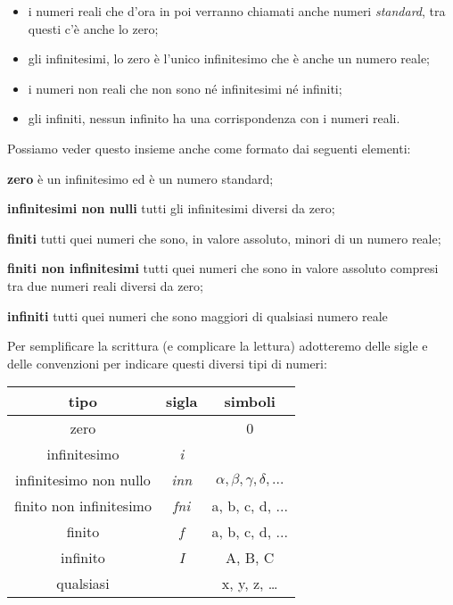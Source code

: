 \begin{itemize} [noitemsep]
 \item i numeri reali che d'ora in poi verranno chiamati anche numeri 
\emph{standard}, tra questi c'è anche lo zero;
 \item gli infinitesimi, lo zero è l'unico infinitesimo che è anche un numero 
reale;
 \item i numeri non reali che non sono né infinitesimi né infiniti;
 \item gli infiniti, nessun infinito ha una corrispondenza con i numeri reali.
\end{itemize}

Possiamo veder questo insieme anche come formato dai seguenti elementi:

\begin{description} [noitemsep]
 \item \textbf{zero}
 è un infinitesimo ed è un numero standard;
 \item \textbf{infinitesimi non nulli}
 tutti gli infinitesimi diversi da zero;
 \item \textbf{finiti}
 tutti quei numeri che sono, in valore assoluto, minori di un numero reale;
 \item \textbf{finiti non infinitesimi}
 tutti quei numeri che sono in valore assoluto compresi tra due numeri reali 
 diversi da zero;
 \item \textbf{infiniti}
 tutti quei numeri che sono maggiori di qualsiasi numero reale

\end{description}
 
Per semplificare la scrittura (e complicare la lettura) adotteremo delle sigle 
e delle convenzioni per indicare questi diversi tipi di numeri:

\begin{center}
\begin{tabular}{ccc}\toprule
tipo & sigla & simboli\\\midrule
zero &  & 0\\
infinitesimo & \emph{i} & \\
infinitesimo non nullo & \emph{inn} & $\alpha, \beta, \gamma, \delta, \dots$\\
finito non infinitesimo& \emph{fni} & a, b, c, d, ...\\
finito & \emph{f} & a, b, c, d, ...\\
infinito & \emph{I} & A, B, C\\
qualsiasi &  & x, y, z, \ldots\\\bottomrule
\end{tabular}
\label{tab:insnum_tipi}
\end{center}

